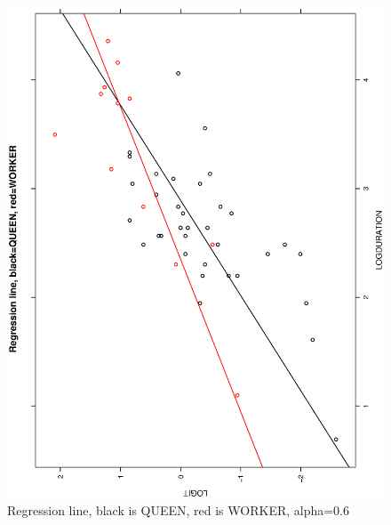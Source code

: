 \documentclass[a4paper,10pt]{article}
\begin{document}
\begin{figure}
\includegraphics[angle=-90, width=1\textwidth]{figures/math650_hw8_fig3_alpha0_6.eps}
\caption{Regression line, black is QUEEN, red is WORKER, alpha=0.6}\label{f7}
\end{figure}
\end{document}
